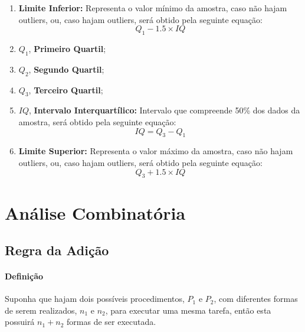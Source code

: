 \documentclass{article}
\begin{document}
                \begin{enumerate}[rightmargin = \leftmargin, noitemsep]
                    \item \textbf{Limite Inferior:} Representa o valor mínimo da amostra, caso não hajam outliers, ou, caso hajam outliers, será obtido pela seguinte equação:
                        \begin{equation}
                            \boxed{
                                Q_{1} - 1.5 \times IQ
                            }
                        \end{equation}
                    \item $Q_{1}$, \textbf{Primeiro Quartil};
                    \item $Q_{2}$, \textbf{Segundo Quartil};
                    \item $Q_{3}$, \textbf{Terceiro Quartil};
                    \item $IQ$, \textbf{Intervalo Interquartílico:} Intervalo que compreende 50\% dos dados da amostra, será obtido pela seguinte equação:
                        \begin{equation}
                            \boxed{
                                IQ = Q_{3} - Q_{1}
                            }
                        \end{equation}
                    \item \textbf{Limite Superior:} Representa o valor máximo da amostra, caso não hajam outliers, ou, caso hajam outliers, será obtido pela seguinte equação:
                        \begin{equation}
                            \boxed{
                                Q_{3} + 1.5 \times IQ
                            }
                        \end{equation}

                \end{enumerate}
\newpage

    \section{Análise Combinatória}
        \subsection{Regra da Adição}
            \paragraph{Definição}Suponha que hajam dois possíveis procedimentos, $P_{1}$ e $P_{2}$, com diferentes formas de serem realizados, $n_{1}$ e $n_{2}$, para executar uma mesma tarefa, então esta possuirá $n_{1} + n_{2}$ formas de ser executada.
\end{document}
